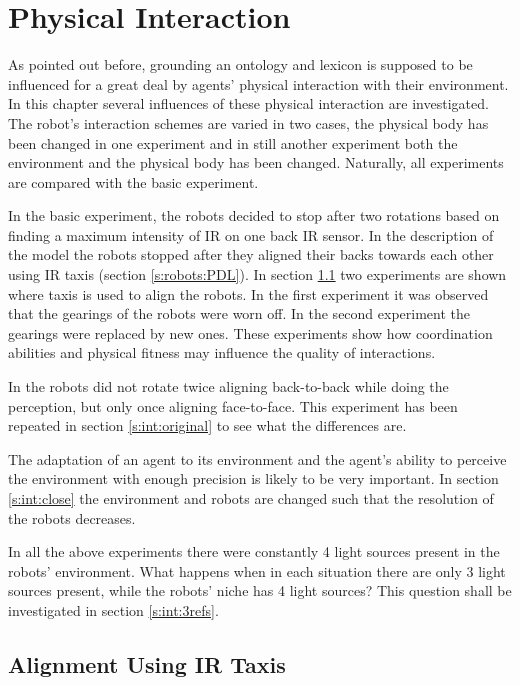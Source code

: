 \chapter{Physical Interaction}\label{ch:interaction}

As pointed out before, grounding an ontology and lexicon is supposed to be influenced for a great deal by agents' physical interaction with their environment. In this chapter several influences of these physical interaction are investigated. The robot's interaction schemes are varied in two cases, the physical body has been changed in one experiment and in still another experiment both the environment and the physical body has been changed. Naturally, all experiments are compared with the basic experiment.

\p
In the basic experiment, the robots decided to stop after two rotations based on finding a maximum intensity of IR on one back IR sensor. In the description of the model the robots stopped after they aligned their backs towards each other using IR taxis (section \ref{s:robots:PDL}). In section \ref{s:int:taxis} two experiments are shown where taxis is used to align the robots. In the first experiment it was observed that the gearings of the robots were worn off. In the second experiment the gearings were replaced by new ones. These experiments show how coordination abilities and physical fitness may influence the quality of interactions.

In \cite{steelsvogt:1997} the robots did not rotate twice aligning back-to-back while doing the perception, but only once aligning face-to-face. This experiment has been repeated in section \ref{s:int:original} to see what the differences are.

The adaptation of an agent to its environment and the agent's ability to perceive the environment with enough precision is likely to be very important. In section \ref{s:int:close} the environment and robots are changed such that the resolution of the robots decreases.

In all the above experiments there were constantly 4 light sources present in the robots' environment. What happens when in each situation there are only 3 light sources present, while the robots' niche has 4 light sources? This question shall be investigated in section \ref{s:int:3refs}.

\section{Alignment Using IR Taxis}\label{s:int:taxis}

